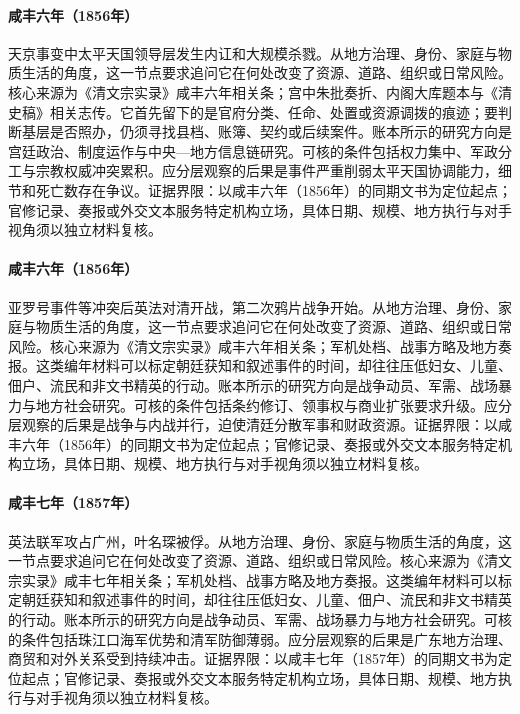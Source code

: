 \hypertarget{social:EQ-1856-TIANJING-INCIDENT}{}\paragraph{咸丰六年（1856年）}天京事变中太平天国领导层发生内讧和大规模杀戮。从地方治理、身份、家庭与物质生活的角度，这一节点要求追问它在何处改变了资源、道路、组织或日常风险。核心来源为《清文宗实录》咸丰六年相关条；宫中朱批奏折、内阁大库题本与《清史稿》相关志传。它首先留下的是官府分类、任命、处置或资源调拨的痕迹；要判断基层是否照办，仍须寻找县档、账簿、契约或后续案件。账本所示的研究方向是宫廷政治、制度运作与中央—地方信息链研究。可核的条件包括权力集中、军政分工与宗教权威冲突累积。应分层观察的后果是事件严重削弱太平天国协调能力，细节和死亡数存在争议。证据界限：以咸丰六年（1856年）的同期文书为定位起点；官修记录、奏报或外交文本服务特定机构立场，具体日期、规模、地方执行与对手视角须以独立材料复核。
\hypertarget{social:EQ-1856-SECOND-OPIUM-WAR-BEGIN}{}\paragraph{咸丰六年（1856年）}亚罗号事件等冲突后英法对清开战，第二次鸦片战争开始。从地方治理、身份、家庭与物质生活的角度，这一节点要求追问它在何处改变了资源、道路、组织或日常风险。核心来源为《清文宗实录》咸丰六年相关条；军机处档、战事方略及地方奏报。这类编年材料可以标定朝廷获知和叙述事件的时间，却往往压低妇女、儿童、佃户、流民和非文书精英的行动。账本所示的研究方向是战争动员、军需、战场暴力与地方社会研究。可核的条件包括条约修订、领事权与商业扩张要求升级。应分层观察的后果是战争与内战并行，迫使清廷分散军事和财政资源。证据界限：以咸丰六年（1856年）的同期文书为定位起点；官修记录、奏报或外交文本服务特定机构立场，具体日期、规模、地方执行与对手视角须以独立材料复核。
\hypertarget{social:EQ-1857-GUANGZHOU-FALL}{}\paragraph{咸丰七年（1857年）}英法联军攻占广州，叶名琛被俘。从地方治理、身份、家庭与物质生活的角度，这一节点要求追问它在何处改变了资源、道路、组织或日常风险。核心来源为《清文宗实录》咸丰七年相关条；军机处档、战事方略及地方奏报。这类编年材料可以标定朝廷获知和叙述事件的时间，却往往压低妇女、儿童、佃户、流民和非文书精英的行动。账本所示的研究方向是战争动员、军需、战场暴力与地方社会研究。可核的条件包括珠江口海军优势和清军防御薄弱。应分层观察的后果是广东地方治理、商贸和对外关系受到持续冲击。证据界限：以咸丰七年（1857年）的同期文书为定位起点；官修记录、奏报或外交文本服务特定机构立场，具体日期、规模、地方执行与对手视角须以独立材料复核。
